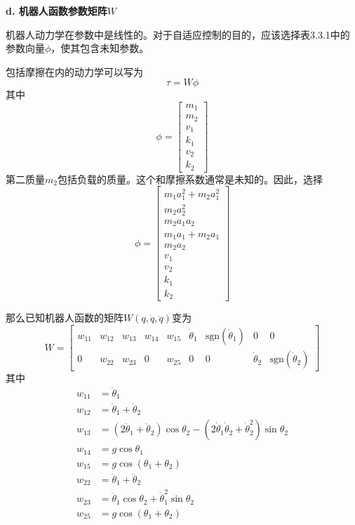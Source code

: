 \documentclass[12pt,a4paper]{ctexart}
\begin{document}
\textbf{d. 机器人函数参数矩阵$W$}

机器人动力学在参数中是线性的。对于自适应控制的目的，应该选择表3.3.1中的参数向量$\phi$，使其包含未知参数。

包括摩擦在内的动力学可以写为
\begin{equation}
\tau = W\phi
\end{equation}
其中
\begin{equation}
\phi = \begin{bmatrix} m_1 \\ m_2 \\ v_1 \\ k_1 \\ v_2 \\ k_2 \end{bmatrix}
\end{equation}
第二质量$m_2$包括负载的质量。这个和摩擦系数通常是未知的。因此，选择
\begin{equation}
\phi = \begin{bmatrix} m_1a_1^2 + m_2a_1^2 \\ m_2a_2^2 \\ m_2a_1a_2 \\ m_1a_1 + m_2a_1 \\ m_2a_2 \\ v_1 \\ v_2 \\ k_1 \\ k_2 \end{bmatrix}
\end{equation}

那么已知机器人函数的矩阵$W(q,\dot{q},\ddot{q})$变为
\begin{equation}
W = \begin{bmatrix} w_{11} & w_{12} & w_{13} & w_{14} & w_{15} & \dot{\theta}_1 & \text{sgn}(\dot{\theta}_1) & 0 & 0 \\ 0 & w_{22} & w_{23} & 0 & w_{25} & 0 & 0 & \dot{\theta}_2 & \text{sgn}(\dot{\theta}_2) \end{bmatrix}
\end{equation}
其中
\begin{align}
w_{11} &= \ddot{\theta}_1 \\
w_{12} &= \ddot{\theta}_1 + \ddot{\theta}_2 \\
w_{13} &= (2\ddot{\theta}_1 + \ddot{\theta}_2)\cos\theta_2 - (2\dot{\theta}_1\dot{\theta}_2 + \dot{\theta}_2^2)\sin\theta_2 \\
w_{14} &= g\cos\theta_1 \\
w_{15} &= g\cos(\theta_1 + \theta_2) \\
w_{22} &= \ddot{\theta}_1 + \ddot{\theta}_2 \\
w_{23} &= \ddot{\theta}_1\cos\theta_2 + \dot{\theta}_1^2\sin\theta_2 \\
w_{25} &= g\cos(\theta_1 + \theta_2)
\end{align}
\end{document}
